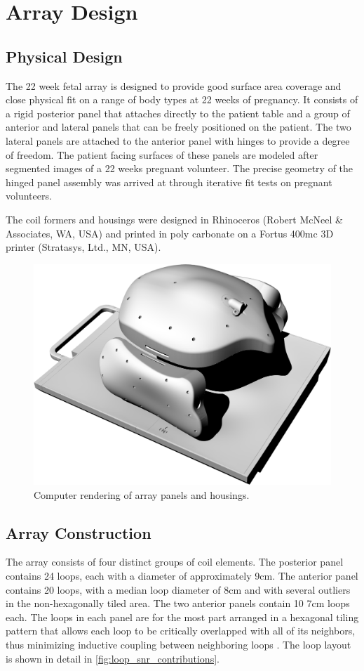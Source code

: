 \chapter{Array Design}
\section{Physical Design}
The 22 week fetal array is designed to provide good surface area coverage and close physical fit on a range of body
types at 22 weeks of pregnancy.  It consists of a rigid posterior panel that attaches directly to the patient table and
a group of anterior and lateral panels that can be freely positioned on the patient. The two lateral panels are attached
to the anterior panel with hinges to provide a degree of freedom. The patient facing surfaces of these panels are
modeled after segmented images of a 22 weeks pregnant volunteer. The precise geometry of the hinged panel assembly was
arrived at through iterative fit tests on pregnant volunteers.
 
The coil formers and housings were designed in Rhinoceros (Robert McNeel \& Associates, WA, USA) and printed in
poly carbonate on a Fortus 400mc 3D printer (Stratasys, Ltd., MN, USA).

\begin{figure}
\includegraphics[width=6in]{figures/cad_rendering.png}
\caption{Computer rendering of array panels and housings.}
\label{fig:cad_rendering}
\end{figure}

\section{Array Construction}
The array consists of four distinct groups of coil elements. The posterior panel contains 24 loops, each with a diameter
of approximately 9cm. The anterior panel contains 20 loops, with a median loop diameter of 8cm and with several outliers
in the non-hexagonally tiled area. The two anterior panels contain 10 7cm loops each. The loops in each panel are for
the most part arranged in a hexagonal tiling pattern that allows each loop to be critically overlapped with all of its
neighbors,  thus minimizing inductive coupling between neighboring loops \cite{Roemer90}. The loop layout is shown in
detail in \ref{fig:loop_snr_contributions}.

